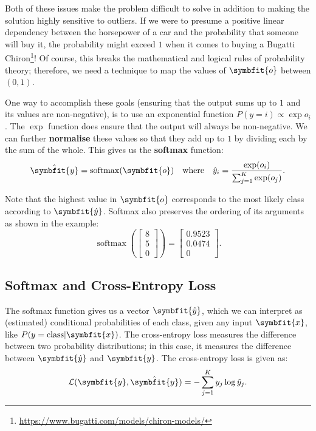 Both of these issues make the problem difficult to solve in addition to making the solution highly sensitive to outliers. If we were to presume a positive linear dependency between the horsepower of a car and the probability that someone will buy it, the probability might exceed $1$ when it comes to buying a Bugatti Chiron\footnote{\url{https://www.bugatti.com/models/chiron-models/}}! Of course, this breaks the mathematical and logical rules of probability theory; therefore, we need a technique to map the values of $\symbfit{o}$ between $(0, 1)$.

One way to accomplish these goals (ensuring that the output sums up to $1$ and its values are non-negative), is to use an exponential function $P(y = i) \propto \exp o_i$. The $\exp$ function does ensure that the output will always be non-negative. We can further \textbf{normalise} these values so that they add up to $1$ by dividing each by the sum of the whole. This gives us the \textbf{softmax} function:
\begin{equation}
    \hat{\symbfit{y}} = \operatorname{softmax}(\symbfit{o}) \quad \text{where}\quad \hat{y}_i = \frac{\exp(o_i)}{\sum_{j=1}^{K} \exp(o_j)}.
    \label{eqn:std-softmax}
\end{equation}

Note that the highest value in $\symbfit{o}$ corresponds to the most likely class according to $\symbfit{\hat{y}}$. Softmax also preserves the ordering of its arguments as shown in the example:
\begin{equation}
    \nonumber
    \operatorname{softmax} \left(\begin{bmatrix}
    8\\
    5\\
    0
    \end{bmatrix}\right)
    = 
    \begin{bmatrix}
    0.9523\\
    0.0474\\
    0
    \end{bmatrix}.
\end{equation}

\subsection{Softmax and Cross-Entropy Loss}\label{ssec:ce-loss}

The softmax function gives us a vector $\symbfit{\hat{y}}$, which we can interpret as (estimated) conditional probabilities of each class, given any input $\symbfit{x}$, like $P(y=\text{class} | \symbfit{x})$. 
The cross-entropy loss measures the difference between two probability distributions; in this case, it measures the difference between $\symbfit{\hat{y}}$ and $\symbfit{y}$. The cross-entropy loss is given as:
\begin{equation}\label{eqn:ce-loss}
    \mathcal{L}(\symbfit{y}, \hat{\symbfit{y}}) = - \sum_{j=1}^K y_j \log \hat{y}_j.
\end{equation}

